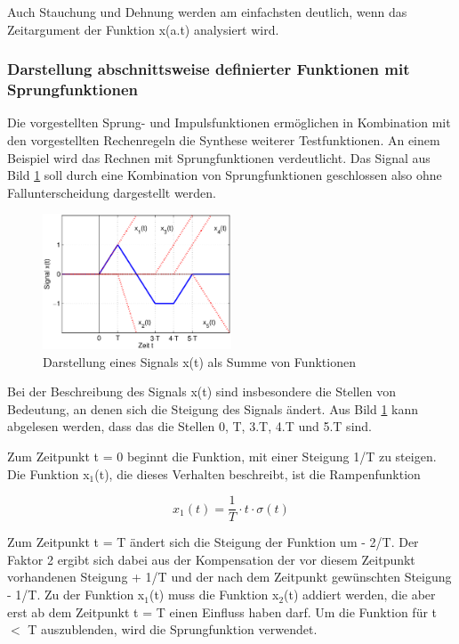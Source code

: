 \noindent Auch Stauchung und Dehnung werden am einfachsten deutlich, wenn das Zeitargument der Funktion x(a$.$t) analysiert wird.

\clearpage

\subsubsection{ Darstellung abschnittsweise definierter Funktionen mit Sprungfunktionen}

\noindent Die vorgestellten Sprung- und Impulsfunktionen erm\"{o}glichen in Kombination mit den vorgestellten Rechenregeln die Synthese weiterer Testfunktionen. An einem Beispiel wird das Rechnen mit Sprungfunktionen verdeutlicht. Das Signal aus Bild \ref{fig:Ueberlagerung} soll durch eine Kombination von Sprungfunktionen geschlossen also ohne Fallunterscheidung dargestellt werden.

\begin{figure}[ht]
  \centerline{\includegraphics[width=0.5\textwidth]{Kapitel1/Bilder/image18}}
  \caption{Darstellung eines Signals x(t) als Summe von Funktionen}
  \label{fig:Ueberlagerung}
\end{figure}

\noindent Bei der Beschreibung des Signals x(t) sind insbesondere die Stellen von Bedeutung, an denen sich die Steigung des Signals \"{a}ndert. Aus Bild \ref{fig:Ueberlagerung} kann abgelesen werden, dass das die Stellen 0, T, 3$.$T, 4$.$T und 5$.$T sind.

\noindent Zum Zeitpunkt t = 0 beginnt die Funktion, mit einer Steigung 1/T zu steigen. Die Funktion x${}_{1}$(t), die dieses Verhalten beschreibt, ist die Rampenfunktion

\begin{equation}\label{eq:onefiftytwo}
x_{1} \left(t\right)=\dfrac{1}{T} \cdot t\cdot \sigma \left(t\right)
\end{equation}


\noindent Zum Zeitpunkt t = T \"{a}ndert sich die Steigung der Funktion um - 2/T. Der Faktor 2 ergibt sich dabei aus der Kompensation der vor diesem Zeitpunkt vorhandenen Steigung + 1/T und der nach dem Zeitpunkt gew\"{u}nschten Steigung - 1/T. Zu der Funktion x${}_{1}$(t) muss die Funktion x${}_{2}$(t) addiert werden, die aber erst ab dem Zeitpunkt t = T einen Einfluss haben darf. Um die Funktion f\"{u}r t $\mathrm{<}$ T auszublenden, wird die Sprungfunktion verwendet. 

